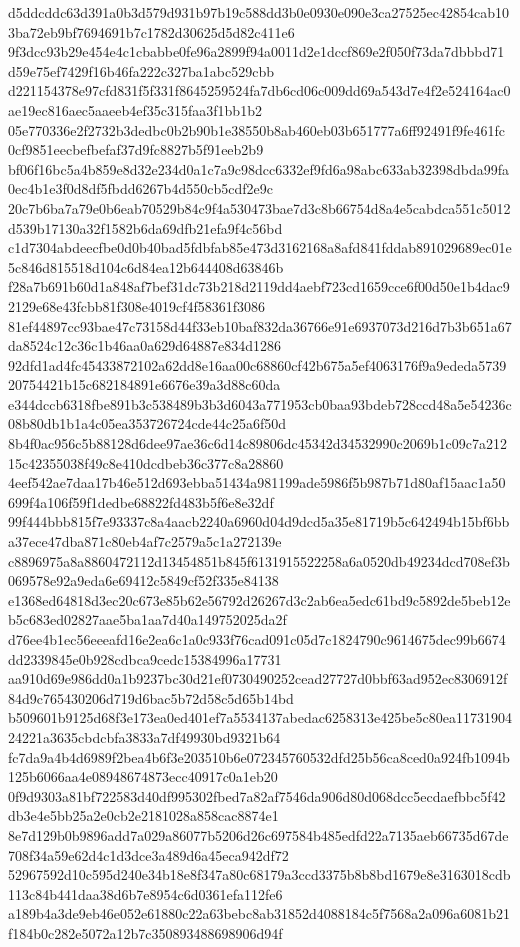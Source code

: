 \documentclass[11pt,a4paper]{article}
\begin{document}
{d5ddcddc63d391a0b3d579d931b97b19c588dd3b0e0930e090e3ca27525ec42854cab103ba72eb9bf7694691b7c1782d30625d5d82c411e6
9f3dcc93b29e454e4c1cbabbe0fe96a2899f94a0011d2e1dccf869e2f050f73da7dbbbd71d59e75ef7429f16b46fa222c327ba1abc529cbb
d221154378e97cfd831f5f331f8645259524fa7db6cd06c009dd69a543d7e4f2e524164ac0ae19ec816aec5aaeeb4ef35c315faa3f1bb1b2
05e770336e2f2732b3dedbc0b2b90b1e38550b8ab460eb03b651777a6ff92491f9fe461fc0cf9851eecbefbefaf37d9fc8827b5f91eeb2b9
bf06f16bc5a4b859e8d32e234d0a1c7a9c98dcc6332ef9fd6a98abc633ab32398dbda99fa0ec4b1e3f0d8df5fbdd6267b4d550cb5cdf2e9c
20c7b6ba7a79e0b6eab70529b84c9f4a530473bae7d3c8b66754d8a4e5cabdca551c5012d539b17130a32f1582b6da69dfb21efa9f4c56bd
c1d7304abdeecfbe0d0b40bad5fdbfab85e473d3162168a8afd841fddab891029689ec01e5c846d815518d104c6d84ea12b644408d63846b
f28a7b691b60d1a848af7bef31dc73b218d2119dd4aebf723cd1659cce6f00d50e1b4dac92129e68e43fcbb81f308e4019cf4f58361f3086
81ef44897cc93bae47c73158d44f33eb10baf832da36766e91e6937073d216d7b3b651a67da8524c12c36c1b46aa0a629d64887e834d1286
92dfd1ad4fc45433872102a62dd8e16aa00c68860cf42b675a5ef4063176f9a9ededa573920754421b15c682184891e6676e39a3d88c60da
e344dccb6318fbe891b3c538489b3b3d6043a771953cb0baa93bdeb728ccd48a5e54236c08b80db1b1a4c05ea353726724cde44c25a6f50d
8b4f0ac956c5b88128d6dee97ae36c6d14c89806dc45342d34532990c2069b1c09c7a21215c42355038f49c8e410dcdbeb36c377c8a28860
4eef542ae7daa17b46e512d693ebba51434a981199ade5986f5b987b71d80af15aac1a50699f4a106f59f1dedbe68822fd483b5f6e8e32df
99f444bbb815f7e93337c8a4aacb2240a6960d04d9dcd5a35e81719b5c642494b15bf6bba37ece47dba871c80eb4af7c2579a5c1a272139e
c8896975a8a8860472112d13454851b845f6131915522258a6a0520db49234dcd708ef3b069578e92a9eda6e69412c5849cf52f335e84138
e1368ed64818d3ec20c673e85b62e56792d26267d3c2ab6ea5edc61bd9c5892de5beb12eb5c683ed02827aae5ba1aa7d40a149752025da2f
d76ee4b1ec56eeeafd16e2ea6c1a0c933f76cad091c05d7c1824790c9614675dec99b6674dd2339845e0b928cdbca9cedc15384996a17731
aa910d69e986dd0a1b9237bc30d21ef0730490252cead27727d0bbf63ad952ec8306912f84d9c765430206d719d6bac5b72d58c5d65b14bd
b509601b9125d68f3e173ea0ed401ef7a5534137abedac6258313e425be5c80ea1173190424221a3635cbdcbfa3833a7df49930bd9321b64
fc7da9a4b4d6989f2bea4b6f3e203510b6e072345760532dfd25b56ca8ced0a924fb1094b125b6066aa4e08948674873ecc40917c0a1eb20
0f9d9303a81bf722583d40df995302fbed7a82af7546da906d80d068dcc5ecdaefbbc5f42db3e4e5bb25a2e0cb2e2181028a858cac8874e1
8e7d129b0b9896add7a029a86077b5206d26c697584b485edfd22a7135aeb66735d67de708f34a59e62d4c1d3dce3a489d6a45eca942df72
52967592d10c595d240e34b18e8f347a80c68179a3ccd3375b8b8bd1679e8e3163018cdb113c84b441daa38d6b7e8954c6d0361efa112fe6
a189b4a3de9eb46e052e61880c22a63bebc8ab31852d4088184c5f7568a2a096a6081b21f184b0c282e5072a12b7c350893488698906d94f
}
\end{document}
